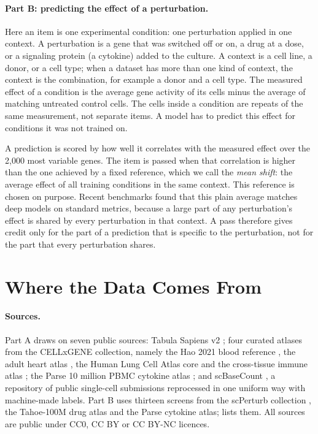 \documentclass[]{style}
\begin{document}
\paragraph{Part B: predicting the effect of a perturbation.}
Here an item is one experimental condition: one perturbation applied in one context. A
perturbation is a gene that was switched off or on, a drug at a dose, or a signaling
protein (a cytokine) added to the culture. A context is a cell line, a donor, or a cell
type; when a dataset has more than one kind of context, the context is the combination,
for example a donor and a cell type. The measured effect of a condition is the average
gene activity of its cells minus the average of matching untreated control cells. The
cells inside a condition are repeats of the same measurement, not separate items. A model
has to predict this effect for conditions it was not trained on.

A prediction is scored by how well it correlates with the measured effect over the 2,000
most variable genes. The item is passed when that correlation is higher than the one
achieved by a fixed reference, which we call the \emph{mean shift}: the average effect of
all training conditions in the same context. This reference is chosen on purpose. Recent
benchmarks \citep{systema,perturbench,ahlmann2025} found that this plain average matches
deep models on standard metrics, because a large part of any perturbation's effect is
shared by every perturbation in that context. A pass therefore gives credit only for the
part of a prediction that is specific to the perturbation, not for the part that every
perturbation shares.

\section{Where the Data Comes From}
\label{sec:data}

\paragraph{Sources.}
Part A draws on seven public sources: Tabula Sapiens v2 \citep{tabulasapiens2}; four
curated atlases from the CELLxGENE collection, namely the Hao 2021 blood reference
\citep{hao2021}, the adult heart atlas \citep{litvinukova2020}, the Human Lung Cell Atlas
core \citep{sikkema2023} and the cross-tissue immune atlas \citep{dominguezconde2022}; the
Parse 10 million PBMC cytokine atlas \citep{parsepbmc}; and scBaseCount
\citep{scbasecount}, a repository of public single-cell submissions reprocessed in one
uniform way with machine-made labels. Part B uses thirteen screens from the scPerturb
collection \citep{scperturb}, the Tahoe-100M drug atlas \citep{tahoe} and the Parse
cytokine atlas;  lists them. All sources are public under CC0, CC BY or
CC BY-NC licences.
\end{document}
